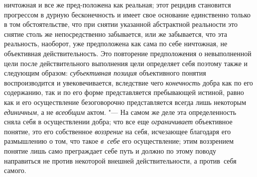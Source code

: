 ничтожная и все же пред-положена как реальная; этот рецидив становится
прогрессом в дурную бесконечность и имеет свое основание единственно только
в том обстоятельстве, что при снятии указанной абстрактной реальности это
снятие столь же непосредственно забывается, или же забывается, что эта
реальность, наоборот, уже предположена как сама по себе ничтожная, не
объективная действительность. Это повторение предположения о невыполненной
цели после действительного выполнения цели определяет себя поэтому также и
следующим образом: {\em субъективная
позиция} объективного понятия воспроизводится и
увековечивается, вследствие чего
{\em конечность} добра
как по его содержанию, так и по его форме представляется
пребывающей истиной, равно как и его осуществление безоговорочно
представляется всегда лишь некоторым
{\em единичным}, а не
{\em всеобщим} актом. "---
На самом же деле эта определенность сняла себя в
осуществлении добра; что все еще
{\em ограничивает}
объективное понятие, это его собственное
{\em воззрение} на себя,
исчезающее благодаря его размышлению о том, что такое
{\em в~себе} его
осуществление; этим воззрением понятие лишь само преграждает себе путь и
должно по этому поводу направиться не против некоторой внешней
действительности, а против~себя самого.

